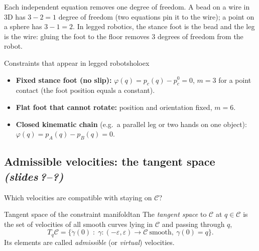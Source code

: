 \documentclass[11pt,a4paper]{article}
\newcommand{\sr}{\emph{(slides\,?--?)}}
\begin{document}
\begin{intuition}
Each independent equation removes one degree of freedom. A bead on a wire in 3D has
$3-2=1$ degree of freedom (two equations pin it to the wire); a point on a sphere has
$3-1=2$. In legged robotics, the stance foot is the bead and the leg is the wire: gluing the
foot to the floor removes $3$ degrees of freedom from the robot.
\end{intuition}

\begin{example}{Constraints that appear in legged robots}{holoex}
\begin{itemize}[nosep]
  \item \textbf{Fixed stance foot (no slip):} $\varphi(q)=p_c(q)-p_c^{0}=0$, $m=3$ for a point
        contact (the foot position equals a constant).
  \item \textbf{Flat foot that cannot rotate:} position and orientation fixed, $m=6$.
  \item \textbf{Closed kinematic chain} (e.g.\ a parallel leg or two hands on one object):
        $\varphi(q)=p_A(q)-p_B(q)=0$.
\end{itemize}
\end{example}

\subsection{Admissible velocities: the tangent space \sr}

Which velocities are compatible with staying on $\mathcal C$?

\begin{definition}{Tangent space of the constraint manifold}{tan}
The \emph{tangent space} to $\mathcal C$ at $q\in\mathcal C$ is the set of velocities of
all smooth curves lying in $\mathcal C$ and passing through $q$,
\[
  T_q\mathcal C=\big\{\dot\gamma(0)\;:\;\gamma:(-\varepsilon,\varepsilon)\to\mathcal C
  \ \text{smooth},\ \gamma(0)=q\big\}.
\]
Its elements are called \emph{admissible} (or \emph{virtual}) velocities.
\end{definition}
\end{document}
